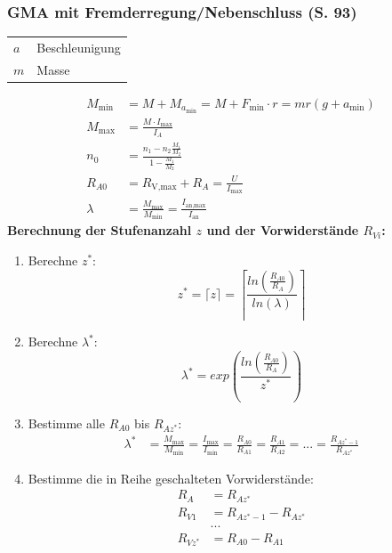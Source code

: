 \documentclass[a4paper,twocolumn,10pt]{article}
\begin{document}
\subsubsection{GMA mit Fremderregung/Nebenschluss (S. 93)}
\begin{tabular}{ll}
$a$ & Beschleunigung\\
$m$ & Masse
\end{tabular}
\begin{equation*}
\begin{split}
M_{\text{min}}&=M+M_{a_\text{min}}=M+ F_{\text{min}}\cdot r=mr(g+a_{\text{min}})\\
M_{\text{max}}&=\frac{M\cdot I_{\text{max}}}{I_A}\\
n_0&=\frac{n_1-n_2\frac{M_1}{M_2}}{1-\frac{M_1}{M_2}}\\
R_{A0}&=R_{\text{V,max}}+R_A=\frac{U}{I_{\text{max}}}\\
\lambda&=\frac{M_{\text{max}}}{M_{\text{min}}}=\frac{I_{\text{an,max}}}{I_{\text{an}}}
\end{split}
\end{equation*}
\textbf{Berechnung der Stufenanzahl $z$ und der Vorwiderstände $R_{Vi}$:}
\begin{enumerate}
\item Berechne $z^*$:
\begin{equation*}
z^*=\lceil z\rceil=\left\lceil\frac{ln\left(\frac{R_{A0}}{R_A}\right)}{ln(\lambda)}\right\rceil
\end{equation*}
\item Berechne $\lambda^*$:
\begin{equation*}
\lambda^*=exp\left(\frac{ln\left(\frac{R_{A0}}{R_A}\right)}{z^*}\right)
\end{equation*}
\item Bestimme alle $R_{A0}$ bis $R_{Az^*}$:
\begin{equation*}
\begin{split}
\lambda^*&=\frac{M_{\text{max}}}{M_{\text{min}}}=\frac{I_{\text{max}}}{I_{\text{min}}}=\frac{R_{A0}}{R_{A1}}=\frac{R_{A1}}{R_{A2}}=...=\frac{R_{Az^*-1}}{R_{Az^*}}
\end{split}
\end{equation*}
\item Bestimme die in Reihe geschalteten Vorwiderstände:
\begin{equation*}
\begin{split}
R_A&=R_{Az^*}\\
R_{V1}&=R_{Az^*-1}-R_{Az^*}\\
&...\\
R_{Vz^*}&=R_{A0}-R_{A1}
\end{split}
\end{equation*}
\end{enumerate}
\end{document}
